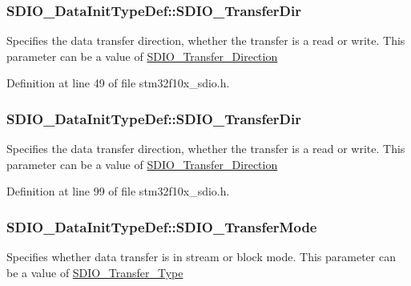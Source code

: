 \subsubsection[{\texorpdfstring{S\+D\+I\+O\+\_\+\+Transfer\+Dir}{SDIO_TransferDir}}]{ S\+D\+I\+O\+\_\+\+Data\+Init\+Type\+Def\+::\+S\+D\+I\+O\+\_\+\+Transfer\+Dir}\hypertarget{struct_s_d_i_o___data_init_type_def_ae05c00dfb0721f2709db0062cd485d1d}{}\label{struct_s_d_i_o___data_init_type_def_ae05c00dfb0721f2709db0062cd485d1d}
Specifies the data transfer direction, whether the transfer is a read or write. This parameter can be a value of \hyperlink{group___s_d_i_o___transfer___direction}{S\+D\+I\+O\+\_\+\+Transfer\+\_\+\+Direction} 

Definition at line 49 of file stm32f10x\+\_\+sdio.\+h.

\subsubsection[{\texorpdfstring{S\+D\+I\+O\+\_\+\+Transfer\+Dir}{SDIO_TransferDir}}]{ S\+D\+I\+O\+\_\+\+Data\+Init\+Type\+Def\+::\+S\+D\+I\+O\+\_\+\+Transfer\+Dir}\hypertarget{struct_s_d_i_o___data_init_type_def_a4838fffdb3f87850569dff12f15485db}{}\label{struct_s_d_i_o___data_init_type_def_a4838fffdb3f87850569dff12f15485db}
Specifies the data transfer direction, whether the transfer is a read or write. This parameter can be a value of \hyperlink{group___s_d_i_o___transfer___direction}{S\+D\+I\+O\+\_\+\+Transfer\+\_\+\+Direction} 

Definition at line 99 of file stm32f10x\+\_\+sdio.\+h.

\subsubsection[{\texorpdfstring{S\+D\+I\+O\+\_\+\+Transfer\+Mode}{SDIO_TransferMode}}]{ S\+D\+I\+O\+\_\+\+Data\+Init\+Type\+Def\+::\+S\+D\+I\+O\+\_\+\+Transfer\+Mode}\hypertarget{struct_s_d_i_o___data_init_type_def_acc370a3377858d8ebeb9702f5decf6d8}{}\label{struct_s_d_i_o___data_init_type_def_acc370a3377858d8ebeb9702f5decf6d8}
Specifies whether data transfer is in stream or block mode. This parameter can be a value of \hyperlink{group___s_d_i_o___transfer___type}{S\+D\+I\+O\+\_\+\+Transfer\+\_\+\+Type} 

